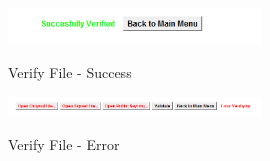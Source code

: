 \begin{figure}[hbt!]
	\centering
      \includegraphics[width=0.6\textwidth]{imgs/ria/sucessverify} \\
	\caption{Verify File - Success}
	\label{fig:specifiyingkeysize}
    \noindent\makebox[\linewidth]{}
\end{figure}

\begin{figure}[hbt!]
	\centering
      \includegraphics[width=0.6\textwidth]{imgs/ria/error2} \\
	\caption{Verify File - Error}
	\label{fig:specifiyingkeysize}
    \noindent\makebox[\linewidth]{}
\end{figure}


